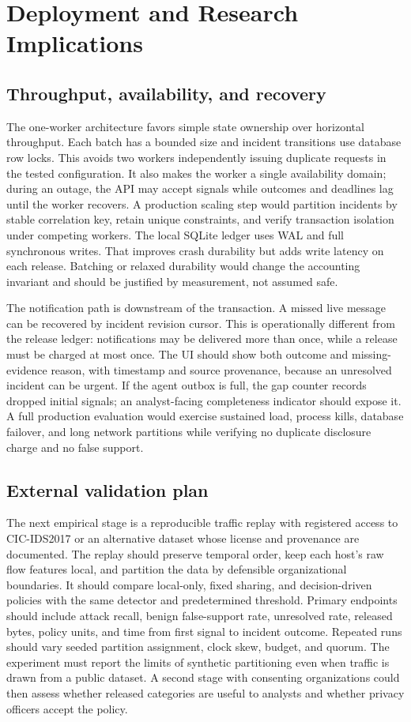 \section{Deployment and Research Implications}

\subsection{Throughput, availability, and recovery}
The one-worker architecture favors simple state ownership over horizontal throughput. Each batch has a bounded size and incident transitions use database row locks. This avoids two workers independently issuing duplicate requests in the tested configuration. It also makes the worker a single availability domain; during an outage, the API may accept signals while outcomes and deadlines lag until the worker recovers. A production scaling step would partition incidents by stable correlation key, retain unique constraints, and verify transaction isolation under competing workers. The local SQLite ledger uses WAL and full synchronous writes. That improves crash durability but adds write latency on each release. Batching or relaxed durability would change the accounting invariant and should be justified by measurement, not assumed safe.

The notification path is downstream of the transaction. A missed live message can be recovered by incident revision cursor. This is operationally different from the release ledger: notifications may be delivered more than once, while a release must be charged at most once. The UI should show both outcome and missing-evidence reason, with timestamp and source provenance, because an unresolved incident can be urgent. If the agent outbox is full, the gap counter records dropped initial signals; an analyst-facing completeness indicator should expose it. A full production evaluation would exercise sustained load, process kills, database failover, and long network partitions while verifying no duplicate disclosure charge and no false support.

\subsection{External validation plan}
The next empirical stage is a reproducible traffic replay with registered access to CIC-IDS2017 or an alternative dataset whose license and provenance are documented. The replay should preserve temporal order, keep each host's raw flow features local, and partition the data by defensible organizational boundaries. It should compare local-only, fixed sharing, and decision-driven policies with the same detector and predetermined threshold. Primary endpoints should include attack recall, benign false-support rate, unresolved rate, released bytes, policy units, and time from first signal to incident outcome. Repeated runs should vary seeded partition assignment, clock skew, budget, and quorum. The experiment must report the limits of synthetic partitioning even when traffic is drawn from a public dataset. A second stage with consenting organizations could then assess whether released categories are useful to analysts and whether privacy officers accept the policy.

